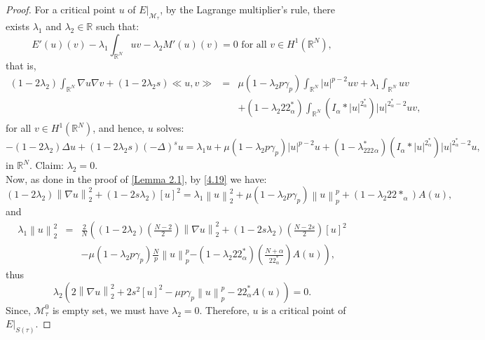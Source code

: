 \documentclass[11pt]{article}
\numberwithin{equation}{section}
\numberwithin{mytheorem}{section}
\begin{document}
		\begin{proof}
			For a critical point $u $ of $E|_{\mathcal{M}_{\tau}}$, by the Lagrange multiplier's rule, there exists $\lambda_1$ and $\lambda_2\in \mathbb{R}$ such that:
			$$E'(u)(v)-\lambda_1 \int_{\mathbb{R}^N}uv-\lambda_2 M'(u)(v)=0 \text{ for all } v\in H^1(\mathbb{R}^N),$$
			that is,
			\begin{eqnarray*}
				(1-2\lambda_2)\int_{\mathbb{R}^N}\nabla u \nabla v +(1-2\lambda_2 s)\ll u,v \gg & = & \mu(1-\lambda_2p\gamma_p)\int_{\mathbb{R}^N}|u|^{p-2}uv+\lambda_1 \int_{\mathbb{R}^N}uv\\
				&& +(1-\lambda_2 22^*_{\alpha})\int_{\mathbb{R}^N}(I_{\alpha}*|u|^{2^*_{\alpha}})|u|^{2^*_{\alpha}-2}uv,
			\end{eqnarray*}
			for all $v\in H^1(\mathbb{R}^N)$, and hence, $u$ solves:
			\begin{equation}\label{4.19}
				-(1-2\lambda_2)\Delta u +(1-2\lambda_2 s)(-\Delta)^su =\lambda_1 u +\mu(1-\lambda_2 p\gamma_p )|u|^{p-2}u+(1-\lambda_222^*_{\alpha})(I_{\alpha}*|u|^{2^*_{\alpha}})|u|^{2^*_{\alpha}-2}u,
			\end{equation}
			in $\mathbb{R}^N$.
			Claim: $\lambda_2=0$. \\
			Now, as done in the proof of \autoref{Lemma 2.1}, by \eqref{4.19} we have:
			\begin{equation*}
				(1-2\lambda_2)\left\| \nabla u \right\|_2^2+(1-2s\lambda_2)[u]^2 = \lambda_1 \left\| u \right\|_2^2+\mu(1-\lambda_2 p\gamma_p)\left\| u \right\|_p^p+(1-\lambda_2 22*_{\alpha})A(u),
			\end{equation*} 
			and
			\begin{eqnarray*}
				\lambda_1 \left\| u \right\|_2^2 & = & \frac{2}{N}\left((1-2\lambda_2)\left(\frac{N-2}{2}\right)\left\| \nabla u \right\|_2^2+(1-2s\lambda_2)\left(\frac{N-2s}{2}\right)[u]^2\right.\\
				&&-\mu(1-\lambda_2 p\gamma_p)\frac{N}{p}\left\| u \right\|_p^p
				\left. - (1-\lambda_2 22^*_{\alpha})\left(\frac{N+\alpha}{22^*_{\alpha}}\right)A(u)\right),
			\end{eqnarray*}
			thus $$\lambda_2\left(2 \left\| \nabla u \right\|_2^2+2s^2[u]^2-\mu p\gamma_p\left\| u \right\|_p^p-22^*_{\alpha}A(u)\right)=0.$$
			Since, $\mathcal{M}_{\tau}^0$ is empty set, we must have $\lambda_2=0$. Therefore, $u$ is a critical point of $E|_{S(\tau)}$.
		\end{proof}
		\noindent 
\end{document}
